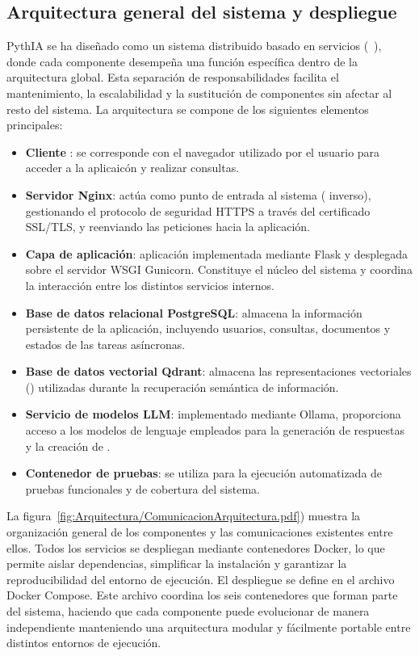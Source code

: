 \subsection{Arquitectura general del sistema y despliegue}
PythIA se ha diseñado como un sistema distribuido basado en servicios (~\cite{diseño:SOA}), donde cada componente desempeña una función específica dentro de la arquitectura global. Esta separación de responsabilidades facilita el mantenimiento, la escalabilidad y la sustitución de componentes sin afectar al resto del sistema. La arquitectura se compone de los siguientes elementos principales:
\begin{itemize}
	\item \textbf{Cliente }: se corresponde con el navegador utilizado por el usuario para acceder a la aplicaicón y realizar consultas.
	\item \textbf{Servidor Nginx}: actúa como punto de entrada al sistema ( inverso), gestionando el protocolo de seguridad HTTPS a través del certificado SSL/TLS, y reenviando las peticiones hacia la aplicación.		
	\item \textbf{Capa de aplicación}: aplicación  implementada mediante Flask y desplegada sobre el servidor WSGI Gunicorn. Constituye el núcleo del sistema y coordina la interacción entre los distintos servicios internos.
	\item \textbf{Base de datos relacional PostgreSQL}: almacena la información persistente de la aplicación, incluyendo usuarios, consultas, documentos y estados de las tareas asíncronas. 
	\item \textbf{Base de datos vectorial Qdrant}: almacena las representaciones vectoriales () utilizadas durante la recuperación semántica de información.	
	\item \textbf{Servicio de modelos LLM}: implementado mediante Ollama, proporciona acceso a los modelos de lenguaje empleados para la generación de respuestas y la creación de .
	\item \textbf{Contenedor de pruebas}: se utiliza para la ejecución automatizada de pruebas funcionales y de cobertura del sistema.
\end{itemize}

La figura~\ref{fig:Arquitectura/ComunicacionArquitectura.pdf}) muestra la organización general de los componentes y las comunicaciones existentes entre ellos. Todos los servicios se despliegan mediante contenedores Docker, lo que permite aislar dependencias, simplificar la instalación y garantizar la reproducibilidad del entorno de ejecución. El despliegue se define en el archivo Docker Compose. Este archivo coordina los seis contenedores que forman parte del sistema,  haciendo que cada componente puede evolucionar de manera independiente manteniendo una arquitectura modular y fácilmente portable entre distintos entornos de ejecución.

